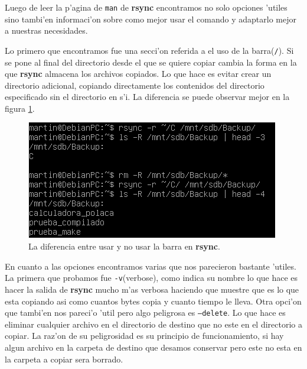 \documentclass[11pt]{article}
\newcommand{\rsync}[0]{\textbf{rsync}}
\begin{document}
		Luego de leer la p'agina de \texttt{man} de \rsync{} encontramos no solo opciones 'utiles sino tambi'en informaci'on sobre como mejor usar el comando y adaptarlo mejor a nuestras necesidades.

		Lo primero que encontramos fue una secci'on referida a el uso de la barra(\texttt{/}). Si se pone al final del directorio desde el que se quiere copiar cambia la forma en la que \rsync{} almacena los archivos copiados. Lo que hace es evitar crear un directorio adicional, copiando directamente los contenidos del directorio especificado sin el directorio en s'i. La diferencia se puede observar mejor en la figura \ref{fig:rsync_backup_forwardslash}.

		\begin{figure}[H]
    			\centering
    			\includegraphics[scale=0.80]{Images/rsync/rsync_backup_forwardslash.PNG}
    			\caption{La diferencia entre usar y no usar la barra en \rsync{}.}
    			\label{fig:rsync_backup_forwardslash}
		\end{figure}

		En cuanto a las opciones encontramos varias que nos parecieron bastante 'utiles. La primera que probamos fue \texttt{-v}(verbose), como indica su nombre lo que hace es hacer la salida de \rsync{} mucho m'as verbosa haciendo que muestre que es lo que esta copiando asi como cuantos bytes copia y cuanto tiempo le lleva. Otra opci'on que tambi'en nos pareci'o 'util pero algo peligrosa es \texttt{--delete}. Lo que hace es eliminar cualquier archivo en el directorio de destino que no este en el directorio a copiar. La raz'on de su peligrosidad es su principio de funcionamiento, si hay algun archivo en la carpeta de destino que desamos conservar pero este no esta en la carpeta a copiar sera borrado.
\end{document}
